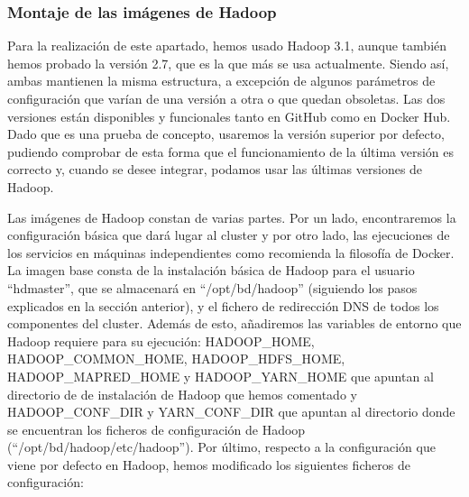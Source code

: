 \subsubsection {Montaje de las imágenes de Hadoop\label{montHadoop}}
Para la realización de este apartado, hemos usado Hadoop 3.1, aunque también hemos probado la versión 2.7, que es la que más se usa actualmente. Siendo así, ambas mantienen la misma estructura, a excepción de algunos parámetros de configuración que varían de una versión a otra o que quedan obsoletas. Las dos versiones están disponibles y funcionales tanto en GitHub como en Docker Hub. Dado que es una prueba de concepto, usaremos la versión superior por defecto, pudiendo comprobar de esta forma que el funcionamiento de la última versión es correcto y, cuando se desee integrar, podamos usar las últimas versiones de Hadoop.\par

Las imágenes de Hadoop constan de varias partes. Por un lado, encontraremos la configuración básica que dará lugar al cluster y por otro lado, las ejecuciones de los servicios en máquinas independientes como recomienda la filosofía de Docker. La imagen base consta de la instalación básica de Hadoop para el usuario “hdmaster”, que se almacenará en “/opt/bd/hadoop” (siguiendo los pasos explicados en la sección anterior), y el fichero de redirección DNS de todos los componentes del cluster. Además de esto, añadiremos las variables de entorno que Hadoop requiere para su ejecución: HADOOP\_HOME, HADOOP\_COMMON\_HOME, HADOOP\_HDFS\_HOME, HADOOP\_MAPRED\_HOME y HADOOP\_YARN\_HOME que apuntan al directorio de de instalación de Hadoop que hemos comentado y HADOOP\_CONF\_DIR y YARN\_CONF\_DIR que apuntan al directorio donde se encuentran los ficheros de configuración de Hadoop (“/opt/bd/hadoop/etc/hadoop”). Por último, respecto a la configuración que viene por defecto en Hadoop, hemos modificado los siguientes ficheros de configuración:\par

